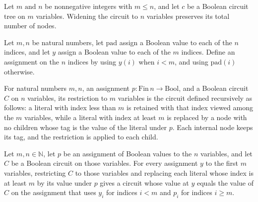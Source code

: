 \begin{theorem}
\label{BoolCircuit.widenCircuit_size}
\leanok
{}
Let $m\text{ and }n$ be nonnegative integers with $m\le n$, and let $c$ be a Boolean
circuit tree on $m$ variables. Widening the circuit to $n$ variables preserves its total
number of nodes.
\end{theorem}

\begin{definition}
\label{BoolCircuit.extendBy}
\leanok
Let $m,n$ be natural numbers, let $\mathrm{pad}$ assign a Boolean value to each of the
$n$ indices, and let $y$ assign a Boolean value to each of the $m$ indices. Define an
assignment on the $n$ indices by using $y(i)$ when $i<m$, and using $\mathrm{pad}(i)$
otherwise.
\end{definition}

\begin{definition}
\label{BoolCircuit.restrictCircuit}
\leanok
{}
For natural numbers $m,n$, an assignment $p : \mathrm{Fin}\,n \to \mathrm{Bool}$, and a
Boolean circuit $C$ on $n$ variables, its restriction to $m$ variables is the circuit
defined recursively as follows: a literal with index less than $m$ is retained with that
index viewed among the $m$ variables, while a literal with index at least $m$ is
replaced by a node with no children whose tag is the value of the literal under $p$.
Each internal node keeps its tag, and the restriction is applied to each child.
\end{definition}

\begin{theorem}
\label{BoolCircuit.restrictCircuit_eval}
\leanok
{}
Let $m,n\in\mathbb{N}$, let $p$ be an assignment of Boolean values to the $n$ variables,
and let $C$ be a Boolean circuit on those variables. For every assignment $y$ to the
first $m$ variables, restricting $C$ to those variables and replacing each literal whose
index is at least $m$ by its value under $p$ gives a circuit whose value at $y$ equals
the value of $C$ on the assignment that uses $y_i$ for indices $i<m$ and $p_i$ for
indices $i\ge m$.
\end{theorem}

